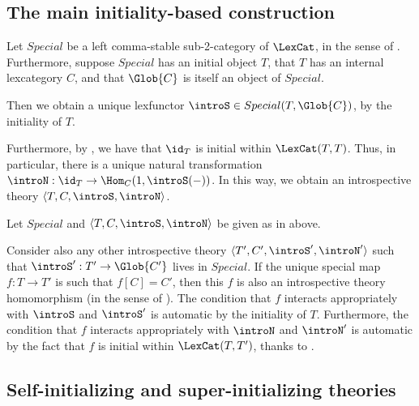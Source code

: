 \subsection{The main initiality-based construction}
\begin{construction}\label{SpecialInitialIntrosp}
Let $Special$ be a left comma-stable sub-2-category of $\LexCat$, in the sense of . Furthermore, suppose $Special$ has an initial object $T$, that $T$ has an internal lexcategory $C$, and that $\Glob{C}$ is itself an object of $Special$.

Then we obtain a unique lexfunctor $\introS \in Special(T, \Glob{C})$, by the initiality of $T$.

Furthermore, by , we have that $\id_T$ is initial within $\LexCat(T, T)$. Thus, in particular, there is a unique natural transformation $\introN : \id_T \to \Hom_C(1, \introS(-))$. In this way, we obtain an introspective theory $\langle T, C, \introS, \introN \rangle$.
\end{construction}

\begin{theorem}
Let $Special$ and $\langle T, C, \introS, \introN \rangle$ be given as in  above.

Consider also any other introspective theory $\langle T', C', \introS', \introN' \rangle$ such that $\introS' : T' \to \Glob{C'}$ lives in $Special$. If the unique special map $f : T \to T'$ is such that $f[C] = C'$, then this $f$ is also an introspective theory homomorphism (in the sense of ). The condition that $f$ interacts appropriately with $\introS$ and $\introS'$ is automatic by the initiality of $T$. Furthermore, the condition that $f$ interacts appropriately with $\introN$ and $\introN'$ is automatic by the fact that $f$ is initial within $\LexCat(T, T')$, thanks to .
\end{theorem}

\subsection{Self-initializing and super-initializing theories}
